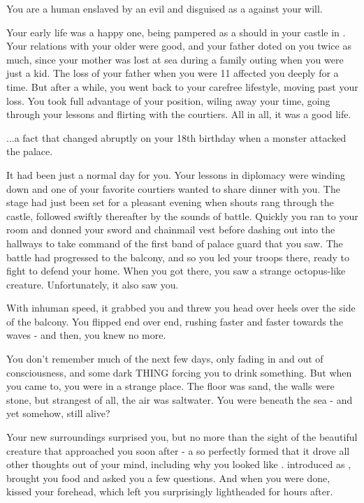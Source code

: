 \documentclass[char]{NeptuneBall}
\begin{document}
\name{\cSlave{}}



You are a human \cSlave{\Prince} enslaved by an evil \cWitch{\magician} and disguised as a \cSlave{\mer} against your will.

Your early life was a happy one, being pampered as a \cSlave{\prince} should in your castle in \pAmerica{}. Your relations with your older \cEric{\sibling} were good, and your father doted on you twice as much, since your mother was lost at sea during a family outing when you were just a kid. The loss of your father when you were 11 affected you deeply for a time. But after a while, you went back to your carefree lifestyle, moving past your loss. You took full advantage of your position, wiling away your time, going through your lessons and flirting with the courtiers. All in all, it was a good life.

...a fact that changed abruptly on your 18th birthday when a monster attacked the palace.

It had been just a normal day for you. Your lessons in diplomacy were winding down and one of your favorite courtiers wanted to share dinner with you. The stage had just been set for a pleasant evening when shouts rang through the castle, followed swiftly thereafter by the sounds of battle. Quickly you ran to your room and donned your sword and chainmail vest before dashing out into the hallways to take command of the first band of palace guard that you saw. The battle had progressed to the balcony, and so you led your troops there, ready to fight to defend your home. When you got there, you saw a strange octopus-like creature. Unfortunately, it also saw you.

With inhuman speed, it grabbed you and threw you head over heels over the side of the balcony. You flipped end over end, rushing faster and faster towards the waves - and then, you knew no more.

You don't remember much of the next few days, only fading in and out of consciousness, and some dark THING forcing you to drink something. But when you came to, you were in a strange place. The floor was sand, the walls were stone, but strangest of all, the air was saltwater. You were beneath the sea - and yet somehow, still alive?

Your new surroundings surprised you, but no more than the sight of the beautiful creature that approached you soon after - a \cWitch{\mer} so perfectly formed that it drove all other thoughts out of your mind, including why you looked like \cWitch{\them}. \cWitch{\They} introduced \cWitch{\themself} as \cWitch{}, brought you food and asked you a few questions. And when you were done, \cWitch{\they} kissed your forehead, which left you surprisingly lightheaded for hours after.
\end{document}
